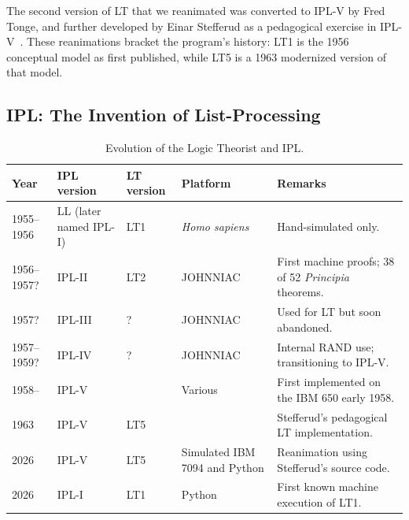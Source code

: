\documentclass{IEEEcsmag}
\begin{document}
The second version of LT that we reanimated was converted to IPL-V by Fred Tonge, and further developed
by Einar Stefferud as a pedagogical exercise in IPL-V~\cite[Section~I]{stefferud1963lt}.
These  reanimations  bracket the program's
history: LT1 is the 1956 conceptual model as first published, while
LT5 is a 1963 modernized version of that model.

\subsection{IPL: The Invention of List-Processing}

\begin{table}[h]
\centering
\caption{Evolution of the Logic Theorist and IPL.}
\label{tab:lt_versions}
\begin{tabular}{@{}lllll@{}}
\toprule
\textbf{Year} & \textbf{IPL version} & \textbf{LT version} & \textbf{Platform} & \textbf{Remarks} \\ \midrule
1955--1956 & LL (later named IPL-I) & LT1 & \textit{Homo sapiens} & Hand-simulated only. \\
1956--1957? & IPL-II & LT2 & JOHNNIAC & First machine proofs; 38 of 52 \textit{Principia} theorems. \\
1957? & IPL-III & ? & JOHNNIAC & Used for LT but soon abandoned. \\
1957--1959? & IPL-IV & ? & JOHNNIAC & Internal RAND use; transitioning to IPL-V. \\
1958-- & IPL-V & \ & Various & First implemented on the IBM 650 early 1958. \\
1963 & IPL-V & LT5 & \ & Stefferud's pedagogical LT implementation. \\
2026 & IPL-V & LT5 & Simulated IBM 7094 and Python & Reanimation using Stefferud's source code. \\
2026 & IPL-I & LT1 & Python & First known machine execution of LT1. \\ \bottomrule
\end{tabular}
\end{table}
\end{document}
